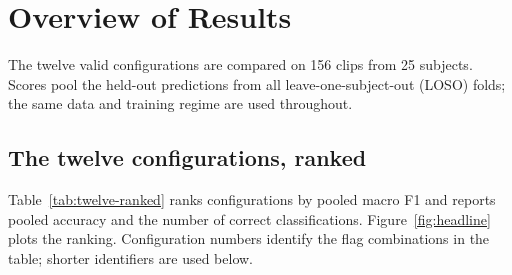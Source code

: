 
\section{Overview of Results}
\label{sec:results-overview}

The twelve valid configurations are compared on 156 clips from 25 subjects. Scores pool the held-out predictions from all leave-one-subject-out (LOSO) folds; the same data and training regime are used throughout.

\subsection{The twelve configurations, ranked}
\label{sec:twelve-ranked}

Table~\ref{tab:twelve-ranked} ranks configurations by pooled macro F1 and reports pooled accuracy and the number of correct classifications. Figure~\ref{fig:headline} plots the ranking. Configuration numbers identify the flag combinations in the table; shorter identifiers are used below.

